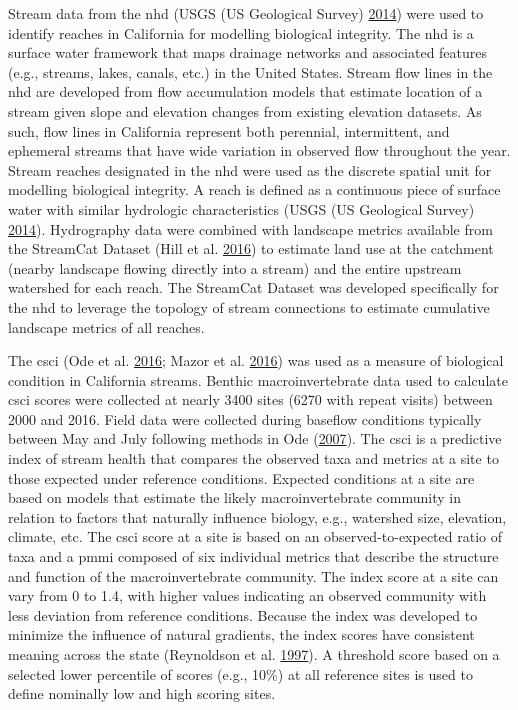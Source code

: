 \documentclass[]{article}
\begin{document}
Stream data from the \ac{nhd} (USGS (US Geological Survey)
\protect\hyperlink{ref-USGS14}{2014}) were used to identify reaches in
California for modelling biological integrity. The \ac{nhd} is a surface
water framework that maps drainage networks and associated features
(e.g., streams, lakes, canals, etc.) in the United States. Stream flow
lines in the \ac{nhd} are developed from flow accumulation models that
estimate location of a stream given slope and elevation changes from
existing elevation datasets. As such, flow lines in California represent
both perennial, intermittent, and ephemeral streams that have wide
variation in observed flow throughout the year. Stream reaches
designated in the \ac{nhd} were used as the discrete spatial unit for
modelling biological integrity. A reach is defined as a continuous piece
of surface water with similar hydrologic characteristics (USGS (US
Geological Survey) \protect\hyperlink{ref-USGS14}{2014}). Hydrography
data were combined with landscape metrics available from the StreamCat
Dataset (Hill et al. \protect\hyperlink{ref-Hill16}{2016}) to estimate
land use at the catchment (nearby landscape flowing directly into a
stream) and the entire upstream watershed for each reach. The StreamCat
Dataset was developed specifically for the \ac{nhd} to leverage the
topology of stream connections to estimate cumulative landscape metrics
of all reaches.

The \ac{csci} (Ode et al. \protect\hyperlink{ref-Ode16}{2016}; Mazor et
al. \protect\hyperlink{ref-Mazor16}{2016}) was used as a measure of
biological condition in California streams. Benthic macroinvertebrate
data used to calculate \ac{csci} scores were collected at nearly 3400
sites (6270 with repeat visits) between 2000 and 2016. Field data were
collected during baseflow conditions typically between May and July
following methods in Ode (\protect\hyperlink{ref-Ode07}{2007}). The
\ac{csci} is a predictive index of stream health that compares the
observed taxa and metrics at a site to those expected under reference
conditions. Expected conditions at a site are based on models that
estimate the likely macroinvertebrate community in relation to factors
that naturally influence biology, e.g., watershed size, elevation,
climate, etc. The \ac{csci} score at a site is based on an
observed-to-expected ratio of taxa and a \ac{pmmi} composed of six
individual metrics that describe the structure and function of the
macroinvertebrate community. The index score at a site can vary from 0
to 1.4, with higher values indicating an observed community with less
deviation from reference conditions. Because the index was developed to
minimize the influence of natural gradients, the index scores have
consistent meaning across the state (Reynoldson et al.
\protect\hyperlink{ref-Reynoldson97}{1997}). A threshold score based on
a selected lower percentile of scores (e.g., 10\%) at all reference
sites is used to define nominally low and high scoring sites.
\end{document}
